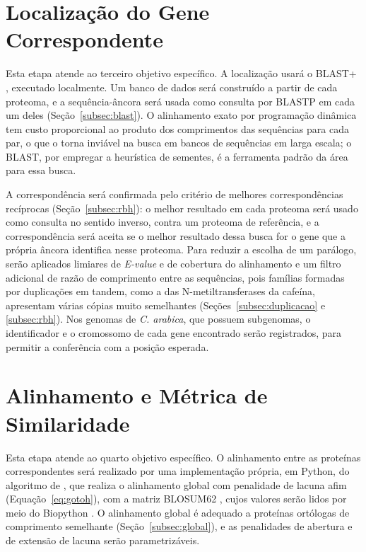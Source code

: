 \section{Localização do Gene Correspondente}

Esta etapa atende ao terceiro objetivo específico. A localização usará o BLAST+ \cite{Camacho2009}, executado localmente. Um banco de dados será construído a partir de cada proteoma, e a sequência-âncora será usada como consulta por BLASTP em cada um deles (Seção~\ref{subsec:blast}). O alinhamento exato por programação dinâmica tem custo proporcional ao produto dos comprimentos das sequências para cada par, o que o torna inviável na busca em bancos de sequências em larga escala; o BLAST, por empregar a heurística de sementes, é a ferramenta padrão da área para essa busca.

A correspondência será confirmada pelo critério de melhores correspondências recíprocas (Seção~\ref{subsec:rbh}): o melhor resultado em cada proteoma será usado como consulta no sentido inverso, contra um proteoma de referência, e a correspondência será aceita se o melhor resultado dessa busca for o gene que a própria âncora identifica nesse proteoma. Para reduzir a escolha de um parálogo, serão aplicados limiares de \textit{E-value} e de cobertura do alinhamento e um filtro adicional de razão de comprimento entre as sequências, pois famílias formadas por duplicações em tandem, como a das N-metiltransferases da cafeína, apresentam várias cópias muito semelhantes (Seções~\ref{subsec:duplicacao} e \ref{subsec:rbh}). Nos genomas de \textit{C. arabica}, que possuem subgenomas, o identificador e o cromossomo de cada gene encontrado serão registrados, para permitir a conferência com a posição esperada.

\section{Alinhamento e Métrica de Similaridade}

Esta etapa atende ao quarto objetivo específico. O alinhamento entre as proteínas correspondentes será realizado por uma implementação própria, em Python, do algoritmo de , que realiza o alinhamento global com penalidade de lacuna afim (Equação~\ref{eq:gotoh}), com a matriz BLOSUM62 \cite{Henikoff1992}, cujos valores serão lidos por meio do Biopython \cite{Cock2009}. O alinhamento global é adequado a proteínas ortólogas de comprimento semelhante (Seção~\ref{subsec:global}), e as penalidades de abertura e de extensão de lacuna serão parametrizáveis.

